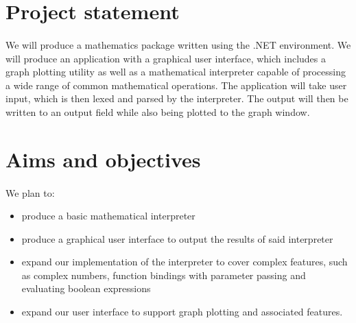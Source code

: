 \documentclass[a4paper, oneside, 11pt]{report}
\begin{document}
    \section{Project statement}
    \paragraph{}
    We will produce a mathematics package written using the .NET environment. We will produce an application with a graphical user interface, which includes a graph plotting utility as well as a mathematical interpreter capable of processing a wide range of common mathematical operations. The application will take user input, which is then lexed and parsed by the interpreter. The output will then be written to an output field while also being plotted to the graph window.

    \section{Aims and objectives}
    \paragraph{}
    We plan to:
    \begin{itemize}
        \item produce a basic mathematical interpreter
        \item produce a graphical user interface to output the results of said interpreter
        \item expand our implementation of the interpreter to cover complex features, such as complex numbers, function bindings with parameter passing and evaluating boolean expressions
        \item expand our user interface to support graph plotting and associated features.
    \end{itemize}
\end{document}
